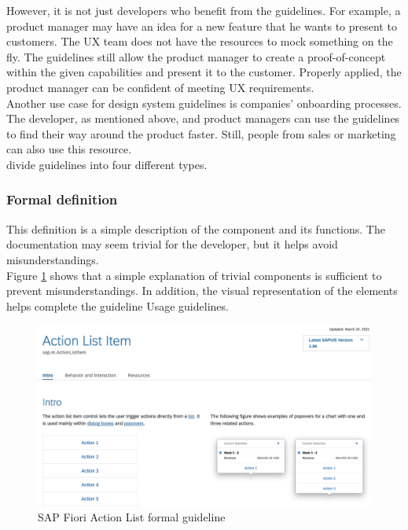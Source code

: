 However, it is not just developers who benefit from the guidelines. For example, a product manager may have an idea for a new feature that he wants to present to customers. The \ac{UX} team does not have the resources to mock something on the fly. The guidelines still allow the product manager to create a proof-of-concept within the given capabilities and present it to the customer. Properly applied, the product manager can be confident of meeting \ac{UX} requirements.  \cite{vesselov_building_2019} \\
Another use case for design system guidelines is companies' onboarding processes. The developer, as mentioned above, and product managers can use the guidelines to find their way around the product faster. Still, people from sales or marketing can also use this resource. \cite{vesselov_building_2019} \\

\citet*{vesselov_building_2019} divide guidelines into four different types.

\subsubsection{Formal definition} 
This definition is a simple description of the component and its functions. The documentation may seem trivial for the developer, but it helps avoid misunderstandings. \cite{vesselov_building_2019}  \\
Figure \ref{fiori_action_list} shows that a simple explanation of trivial components is sufficient to prevent misunderstandings. In addition, the visual representation of the elements helps complete the guideline Usage guidelines.
\begin{figure}[ht]
\centerline{\includegraphics[width=\linewidth]{images/fiori_action-list_formal.png}}
\caption{SAP Fiori Action List formal guideline \cite{sap_fiori_nodate}}
\label{fiori_action_list}
\end{figure}
\newpage

